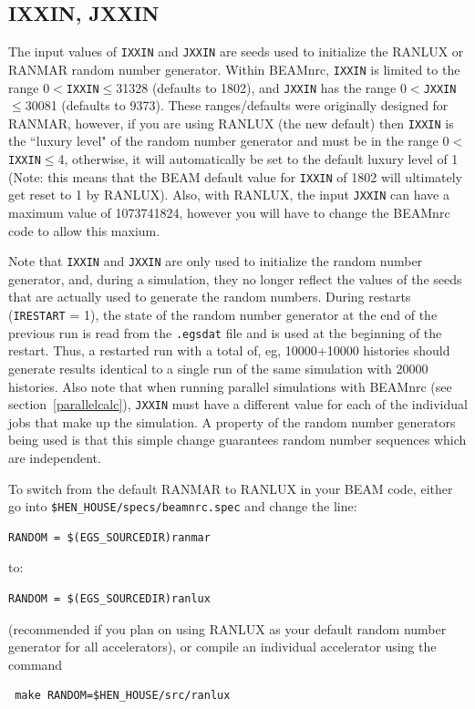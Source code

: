 \documentclass[12pt,twoside]{article}
\begin{document}
\subsection{IXXIN, JXXIN}
\label{rngsect}

The input values of \verb+IXXIN+ and \verb+JXXIN+
are seeds used to initialize the RANLUX\cite{La94,Ja94} or
RANMAR\cite{MZ91,Ma90a}
random number generator.  Within BEAMnrc, {\tt IXXIN} is limited
to the range 0$<${\tt IXXIN}$\leq$31328 (defaults to 1802), and {\tt JXXIN} has
the range 0$<${\tt JXXIN}$\leq$30081 (defaults to 9373).
These ranges/defaults were originally designed for RANMAR, however, if
you are using RANLUX (the new default) then {\tt IXXIN} is the ``luxury level"
of the random number generator and must be in the range
0$<${\tt IXXIN}$\leq$4, otherwise, it will automatically be set to the
default luxury level of 1 (Note: this means that the BEAM default value
for {\tt IXXIN} of 1802 will ultimately get reset to 1 by RANLUX).  Also,
with RANLUX, the input {\tt JXXIN} can have a maximum value of 1073741824,
however you will have to change the BEAMnrc code to allow this maxium.

Note that \verb+IXXIN+ and \verb+JXXIN+ are only used to initialize
the random number generator, and, during a simulation, they no longer
reflect the values of the seeds that are actually used to generate
the random numbers.
During restarts
({\tt IRESTART} = 1), the state of the random number generator at the end
of the previous run is read from the {\tt .egsdat} file and is used at the
beginning of the restart.  Thus, a restarted run with a total of, eg,
10000+10000 histories should generate results identical to a single run
of the same simulation with 20000 histories.  Also note that
when running parallel
simulations with BEAMnrc (see section~\ref{parallelcalc}), {\tt JXXIN} must have
a different value for each of the individual jobs that make up the simulation.
A property of the random number generators being used is that this simple
change guarantees random number sequences which are independent.

To switch from the default RANMAR to RANLUX in your BEAM code, either go into
{\tt \$HEN\_HOUSE/specs/beamnrc.spec} and change the line:
\begin{verbatim}
RANDOM = $(EGS_SOURCEDIR)ranmar
\end{verbatim}
to:
\begin{verbatim}
RANDOM = $(EGS_SOURCEDIR)ranlux
\end{verbatim}
(recommended if you plan on using RANLUX as your default random
number generator for all accelerators),
or compile an individual accelerator using the command
\begin{verbatim}
 make RANDOM=$HEN_HOUSE/src/ranlux
\end{verbatim}
\end{document}
